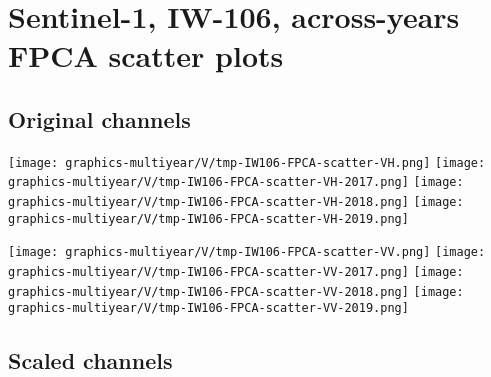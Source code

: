 
\section{Sentinel-1, IW-106, across-years FPCA scatter plots}
\setcounter{theorem}{0}

\renewcommand{\theenumi}{\roman{enumi}}
\renewcommand{\labelenumi}{\textnormal{(\theenumi)}$\;\;$}


\subsection{Original channels}
\label{FPCA-scatter-original-IW106}

\begin{center}
\begin{minipage}{7.0in}
\texttt{[image: graphics-multiyear/V/tmp-IW106-FPCA-scatter-VH.png]}
\quad
\texttt{[image: graphics-multiyear/V/tmp-IW106-FPCA-scatter-VH-2017.png]}
\vskip 1.0cm
\texttt{[image: graphics-multiyear/V/tmp-IW106-FPCA-scatter-VH-2018.png]}
\quad
\texttt{[image: graphics-multiyear/V/tmp-IW106-FPCA-scatter-VH-2019.png]}
\end{minipage}
\end{center}


\clearpage
\begin{center}
\begin{minipage}{7.0in}
\texttt{[image: graphics-multiyear/V/tmp-IW106-FPCA-scatter-VV.png]}
\quad
\texttt{[image: graphics-multiyear/V/tmp-IW106-FPCA-scatter-VV-2017.png]}
\vskip 1.0cm
\texttt{[image: graphics-multiyear/V/tmp-IW106-FPCA-scatter-VV-2018.png]}
\quad
\texttt{[image: graphics-multiyear/V/tmp-IW106-FPCA-scatter-VV-2019.png]}
\end{minipage}
\end{center}


\clearpage

\subsection{Scaled channels}
\label{FPCA-scatter-scaled-IW106}

